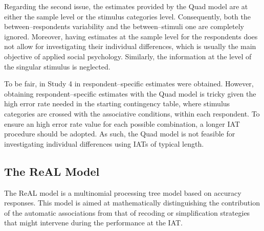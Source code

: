 \documentclass[12pt]{book}
\begin{document}
Regarding the second issue, the estimates provided by the Quad model are at either the sample level or the stimulus categories level. 
Consequently, both the between--respondents variability and the between--stimuli one are completely ignored. 
Moreover, having estimates at the sample level for the respondents does not allow for investigating their individual differences, which is usually the main objective of applied social psychology. 
Similarly, the information at the level of the singular stimulus is neglected. 

To be fair, in Study 4 in  respondent--specific estimates were obtained. 
However, obtaining respondent--specific estimates with the Quad model is tricky given the high error rate needed in the starting contingency table, where stimulus categories are crossed with the associative conditions, within each respondent. To ensure an high error rate value for each possible combination, a longer IAT procedure should be adopted. As such, the Quad model is not feasible for investigating individual differences using IATs of typical length.






\subsection{The ReAL Model}\label{sub:real}

The ReAL model \cite{Meissner2013} is a multinomial processing tree model based on accuracy responses. 
This model is aimed at mathematically distinguishing the contribution of the automatic associations from that of recoding or simplification strategies that might intervene during the performance at the IAT. 
\end{document}
